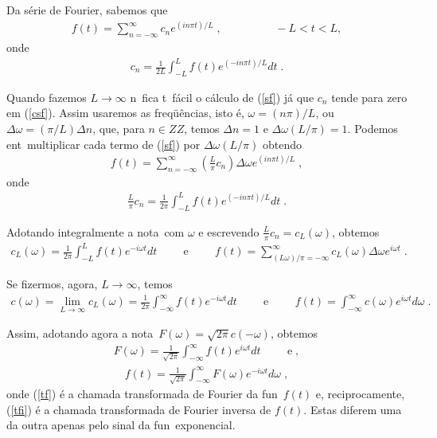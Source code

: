 Da s\'erie de Fourier, sabemos que
\begin{eqnarray} \label{sf}
f(t) = \sum_{n=-\infty}^{\infty} c_n e^{(i n \pi t)/L} \; ,
\hspace{2cm} -L < t < L,
\end{eqnarray}
onde
\begin{eqnarray} \label{csf}
c_n = \frac{1}{2L} \int_{-L}^{L} f(t) e^{(-i n \pi t)/L} dt \; .
\end{eqnarray}

Quando fazemos $L \longrightarrow \infty$ n\ao\ fica t\ao\ f\'acil
o c\'alculo de (\ref{sf}) j\'a que $c_n$ tende para zero em (\ref{csf}).
Assim usaremos as freq\"u\^encias, isto \'e, $\omega = (n \pi)/L$, ou
$\Delta \omega = (\pi/L)\Delta n$, que, para $n \in Z \!\!\! Z$, temos
$\Delta n = 1$ e $\Delta \omega (L/\pi) = 1$. Podemos ent\ao\
multiplicar cada termo de (\ref{sf}) por $\Delta \omega (L/\pi)$
obtendo
\begin{eqnarray}
f(t) = \sum_{n=-\infty}^{\infty} \left(\frac{L}{\pi} c_n\right)
\Delta \omega e^{(i n \pi t)/L} \; ,
\end{eqnarray}
onde
\begin{eqnarray}
\frac{L}{\pi} c_n = \frac{1}{2\pi} \int_{-L}^{L} f(t)
e^{(-i n \pi t)/L} dt \; .
\end{eqnarray}

Adotando integralmente a nota\cao\ com $\omega$ e escrevendo
$\frac{L}{\pi} c_n = c_L(\omega)$, obtemos
\begin{eqnarray}
c_L(\omega) = \frac{1}{2\pi} \int_{-L}^{L} f(t) e^{-i \omega t} dt
\hspace{1cm} \mbox{e} \hspace{1cm} f(t) =
\sum_{(L\omega)/\pi=-\infty}^{\infty} c_L(\omega) \Delta \omega
e^{i \omega t} \; .
\end{eqnarray}

Se fizermos, agora, $L \longrightarrow \infty$, temos
\begin{eqnarray}
c(\omega) = \lim_{L \longrightarrow \infty} c_L(\omega) =
\frac{1}{2\pi} \int_{-\infty}^{\infty}
f(t) e^{-i \omega t} dt \hspace{1cm} \mbox{e} \hspace{1cm} f(t) =
\int_{-\infty}^{\infty} c(\omega) e^{i \omega t} d\omega \; .
\end{eqnarray}

Assim, adotando agora a nota\cao\ $F(\omega) = \sqrt{2\pi} c(-\omega)$,
obtemos
\begin{eqnarray} \label{tf}
F(\omega) = \frac{1}{\sqrt{2\pi}} \int_{-\infty}^{\infty} f(t)
e^{i \omega t} dt \hspace{1cm} \mbox{e} \; ,  
\end{eqnarray}
\begin{eqnarray} \label{tfi}
f(t) = \frac{1}{\sqrt{2\pi}} \int_{-\infty}^{\infty} F(\omega)
e^{-i \omega t} d\omega \; ,
\end{eqnarray}
onde (\ref{tf}) \'e a chamada transformada de Fourier da fun\cao\
$f(t)$ e, reciprocamente, (\ref{tfi}) \'e a chamada transformada de
Fourier inversa de $f(t)$. Estas diferem uma da outra apenas pelo
sinal da fun\cao\ exponencial.                                   

